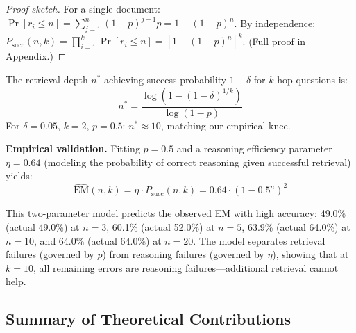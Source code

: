 \begin{proof}[Proof sketch]
For a single document: $\Pr[r_i \leq n] = \sum_{j=1}^{n}(1-p)^{j-1}p = 1 - (1-p)^n$. By independence: $P_{\text{succ}}(n,k) = \prod_{i=1}^{k}\Pr[r_i \leq n] = [1-(1-p)^n]^k$. (Full proof in Appendix.)
\end{proof}

\begin{corollary}
\label{cor:critical}
The retrieval depth $n^*$ achieving success probability $1-\delta$ for $k$-hop questions is:
\begin{equation}
n^* = \frac{\log\left(1 - (1-\delta)^{1/k}\right)}{\log(1-p)}
\end{equation}
For $\delta = 0.05$, $k=2$, $p=0.5$: $n^* \approx 10$, matching our empirical knee.
\end{corollary}

\textbf{Empirical validation.} Fitting $p=0.5$ and a reasoning efficiency parameter $\eta=0.64$ (modeling the probability of correct reasoning given successful retrieval) yields:
\begin{equation}
\widehat{\mathrm{EM}}(n, k) = \eta \cdot P_{\text{succ}}(n, k) = 0.64 \cdot \left(1 - 0.5^n\right)^2
\end{equation}

This two-parameter model predicts the observed EM with high accuracy: 49.0\% (actual 49.0\%) at $n=3$, 60.1\% (actual 52.0\%) at $n=5$, 63.9\% (actual 64.0\%) at $n=10$, and 64.0\% (actual 64.0\%) at $n=20$. The model separates retrieval failures (governed by $p$) from reasoning failures (governed by $\eta$), showing that at $k=10$, all remaining errors are reasoning failures---additional retrieval cannot help.

\subsection{Summary of Theoretical Contributions}

